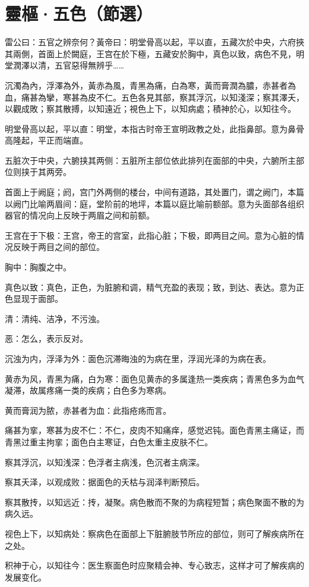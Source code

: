 \documentclass[12pt]{ctexbook}
\begin{document}
\section{靈樞·五色（節選）}%


\begin{yuanwen}
雷公曰：五官之辨奈何？黃帝曰：明堂骨高以起，平以直，五藏次於中央，六府挾其兩側，首面上於闕庭，王宫在於下極，五藏安於胸中，真色以致，病色不見，明堂潤澤以清，五官惡得無辨乎……

沉濁為內，浮澤為外，黃赤為風，青黑為痛，白為寒，黃而膏潤為膿，赤甚者為血，痛甚為攣，寒甚為皮不仁。五色各見其部，察其浮沉，以知淺深；察其澤夭，以觀成敗；察其散搏，以知遠近；視色上下，以知病處；積神於心，以知往今。
\end{yuanwen}


\begin{jiaozhu}
	\item 明堂骨高以起，平以直：明堂，本指古时帝王宣明政教之处，此指鼻部。意为鼻骨高隆起，平正而端直。
	\item 五脏次于中央，六腑挟其两侧：五脏所主部位依此排列在面部的中央，六腑所主部位则挟于其两旁。
	\item 首面上于阙庭；阏，宫门外两侧的楼台，中间有道路，其处置门，谓之阙门，本篇以阙门比喻两眉间：庭，堂阶前的地坪，本篇以庭比喻前额部。意为头面部各组织器官的情况向上反映于两眉之间和前额。
	\item 王宫在于下极：王宫，帝王的宫室，此指心脏；下极，即两目之间。意为心脏的情况反映于两目之间的部位。
	\item 胸中：胸腹之中。
	\item 真色以致：真色，正色，为脏腑和调，精气充盈的表现；致，到达、表达。意为正色显现于面部。
	\item 清：清纯、洁净，不污浊。
	\item 恶：怎么，表示反对。
	\item 沉浊为内，浮泽为外：面色沉滞晦浊的为病在里，浮润光泽的为病在表。
	\item 黄赤为风，青黑为痛，白为寒：面色见黄赤的多属逢热一类疾病；青黑色多为血气凝滞，故属疼痛一类的疾病；白色多为寒病。
	\item 黄而膏润为脓，赤甚者为血：此指疮疡而言。
	\item 痛甚为挛，寒甚为皮不仁：不仁，皮肉不知痛痒，感觉迟钝。面色青黑主痛证，而青黑过重主拘挛；面色白主寒证，白色太重主皮肤不仁。
	\item 察其浮沉，以知浅深：色浮者主病浅，色沉者主病深。
	\item 察其夭泽，以观成败：据面色的夭枯与润泽判断预后。
	\item 察其散抟，以知远近：抟，凝聚。病色散而不聚的为病程短暂；病色聚面不散的为病久远。
	\item 视色上下，以知病处：察病色在面部上下脏腑肢节所应的部位，则可了解疾病所在之处。
	\item 积神于心，以知往今：医生察面色时应聚精会神、专心致志，这样才可了解疾病的发展变化。
\end{jiaozhu}
\end{document}
